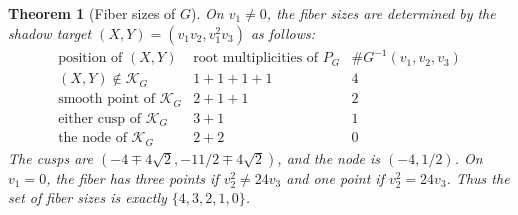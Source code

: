 \documentclass[11pt]{article}
\numberwithin{equation}{section}
\theoremstyle{plain}
\newtheorem{theorem}{Theorem}[section]
\theoremstyle{definition}
\theoremstyle{remark}
\begin{document}
\begin{theorem}[Fiber sizes of $G$]\label{thm:fibG}
On $v_1\ne0$, the fiber sizes are determined by the shadow target
$(X,Y)=(v_1v_2,v_1^2v_3)$ as follows:
\[
\begin{array}{c|c|c}
 \text{position of }(X,Y)&\text{root multiplicities of }P_G&\#G^{-1}(v_1,v_2,v_3)\\ \hline
 (X,Y)\notin\mathcal K_G&1+1+1+1&4\\
 \text{smooth point of }\mathcal K_G&2+1+1&2\\
 \text{either cusp of }\mathcal K_G&3+1&1\\
 \text{the node of }\mathcal K_G&2+2&0
\end{array}
\]
The cusps are $(-4\mp4\sqrt2,-11/2\mp4\sqrt2)$, and the node is
$(-4,1/2)$. On $v_1=0$, the fiber has three points if $v_2^2\ne24v_3$ and
one point if $v_2^2=24v_3$. Thus the set of fiber sizes is exactly
$\{4,3,2,1,0\}$.
\end{theorem}
\end{document}
